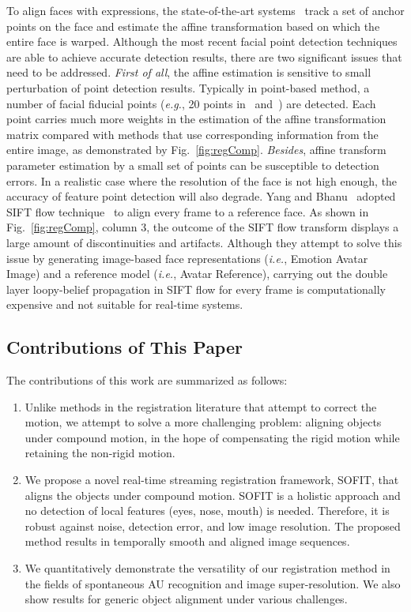 \documentclass[review]{elsarticle}
\begin{document}
To align faces with expressions, the state-of-the-art systems~\cite{Valstar_SMCB12,Littlewort_CERT_FG2011,Tadas_FERA15} track a set of anchor points on the face and estimate the affine transformation based on which the entire face is warped. Although the most recent facial point detection techniques~\cite{Martinez_PAMI13,Xiong13,Zhu_CVPR12,Tadas_ECCV14} are able to achieve accurate detection results, there are two significant issues that need to be addressed. \textit{First of all}, the affine estimation is sensitive to small perturbation of point detection results. Typically in point-based method, a number of facial fiducial points (\textit{e.g.}, 20 points in~\cite{Valstar_SMCB12} and~\cite{Martinez_PAMI13}) are detected. Each point carries much more weights in the estimation of the affine transformation matrix compared with methods that use corresponding information from the entire image, as demonstrated by Fig.~\ref{fig:regComp}. \textit{Besides}, affine transform parameter estimation by a small set of points can be susceptible to detection errors. In a realistic case where the resolution of the face is not high enough, the accuracy of feature point detection will also degrade. Yang and Bhanu~\cite{Yang_SMCB12} adopted SIFT flow technique~\cite{Liu_PAMI11} to align every frame to a reference face. As shown in Fig.~\ref{fig:regComp}, column 3, the outcome of the SIFT flow transform displays a large amount of discontinuities and artifacts. Although they attempt to solve this issue by generating image-based face representations (\textit{i.e.}, Emotion Avatar Image) and a reference model (\textit{i.e.}, Avatar Reference), carrying out the double layer loopy-belief propagation in SIFT flow for every frame is computationally expensive and not suitable for real-time systems.

\subsection{\label{sec:contribution}Contributions of This Paper}

The contributions of this work are summarized as follows:

\begin{enumerate}
	\item Unlike methods in the registration literature that attempt to correct the motion, we attempt to solve a more challenging problem: aligning objects under compound motion, in the hope of compensating the rigid motion while retaining the non-rigid motion.
	\item We propose a novel real-time streaming registration framework, SOFIT, that aligns the objects under compound motion. SOFIT is a holistic approach and no detection of local features (eyes, nose, mouth) is needed. Therefore, it is robust against noise, detection error, and low image resolution. The proposed method results in temporally smooth and aligned image sequences.
	\item We quantitatively demonstrate the versatility of our registration method in the fields of spontaneous AU recognition and image super-resolution. We also show results for generic object alignment under various challenges.
\end{enumerate}
\end{document}
